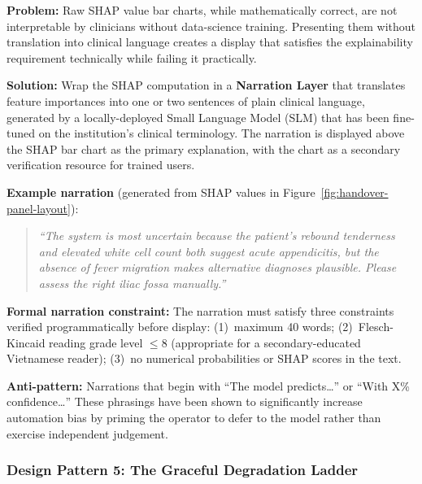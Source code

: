 \begin{tcolorbox}[patternbox,
  title={Design Pattern 4 --- Contextual SHAP Narration}]
\textbf{Problem:} Raw SHAP value bar charts, while
mathematically correct, are not
interpretable by clinicians without data-science training.
Presenting them without translation into clinical language
creates a display that satisfies the explainability requirement
technically while failing it practically.

\textbf{Solution:} Wrap the SHAP computation in a
\textbf{Narration Layer} that translates feature importances into
one or two sentences of plain clinical language, generated by a
locally-deployed Small Language Model (SLM) that has been fine-tuned
on the institution's clinical terminology.
The narration is displayed above the SHAP bar chart as the
primary explanation, with the chart as a secondary verification
resource for trained users.

\textbf{Example narration} (generated from SHAP values in
Figure~\ref{fig:handover-panel-layout}):
\begin{quote}
\small\itshape
``The system is most uncertain because the patient's rebound
tenderness and elevated white cell count both suggest acute
appendicitis, but the absence of fever migration makes
alternative diagnoses plausible.
Please assess the right iliac fossa manually.''
\end{quote}

\textbf{Formal narration constraint:}
The narration must satisfy three constraints verified
programmatically before display:
(1)~maximum 40 words;
(2)~Flesch-Kincaid reading grade level $\leq 8$
(appropriate for a secondary-educated Vietnamese reader);
(3)~no numerical probabilities or SHAP scores in the text.

\textbf{Anti-pattern:} Narrations that begin with
``The model predicts\ldots'' or ``With X\% confidence\ldots''
These phrasings have been shown to significantly increase
automation bias by priming the operator to defer to the
model rather than exercise independent judgement.
\end{tcolorbox}

\subsubsection{Design Pattern 5: The Graceful Degradation
               Ladder}
\label{subsubsec:pattern-degradation-ladder}

